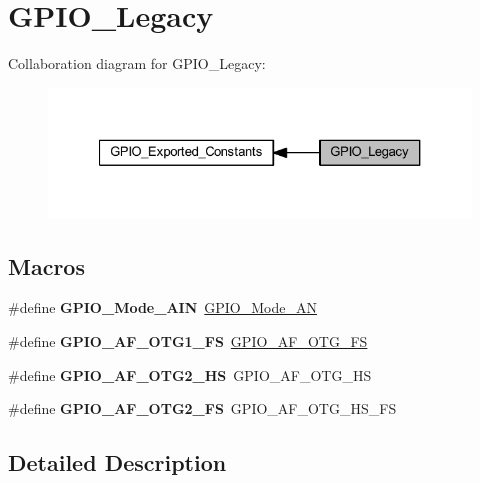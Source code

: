 \hypertarget{group___g_p_i_o___legacy}{}\section{G\+P\+I\+O\+\_\+\+Legacy}
\label{group___g_p_i_o___legacy}
Collaboration diagram for G\+P\+I\+O\+\_\+\+Legacy\+:\nopagebreak
\begin{figure}[H]
\begin{center}
\leavevmode
\includegraphics[width=327pt]{group___g_p_i_o___legacy}
\end{center}
\end{figure}
\subsection*{Macros}
\begin{DoxyCompactItemize}
\item 
\mbox{\label{group___g_p_i_o___legacy_gadf4dafa8caa4e91d2bee996c4bfdf8cc}} 
\#define {\bfseries G\+P\+I\+O\+\_\+\+Mode\+\_\+\+A\+IN}~\hyperlink{group___g_p_i_o_gga1347339e1c84a196fabbb31205eec5d4a6e5c0d7e6d2e22b834b24e1ca1d6d0db}{G\+P\+I\+O\+\_\+\+Mode\+\_\+\+AN}
\item 
\mbox{\label{group___g_p_i_o___legacy_gaddd737997abcd1154c0998b22333b579}} 
\#define {\bfseries G\+P\+I\+O\+\_\+\+A\+F\+\_\+\+O\+T\+G1\+\_\+\+FS}~\hyperlink{group___g_p_i_o___alternat__function__selection__define_gaeba0aeefec841e505170efc7762ae588}{G\+P\+I\+O\+\_\+\+A\+F\+\_\+\+O\+T\+G\+\_\+\+FS}
\item 
\mbox{\label{group___g_p_i_o___legacy_ga54715298b3dc7e843429fd3e24d42cd4}} 
\#define {\bfseries G\+P\+I\+O\+\_\+\+A\+F\+\_\+\+O\+T\+G2\+\_\+\+HS}~G\+P\+I\+O\+\_\+\+A\+F\+\_\+\+O\+T\+G\+\_\+\+HS
\item 
\mbox{\label{group___g_p_i_o___legacy_ga85e574d8321b9d9aaa2790351b4f0c1e}} 
\#define {\bfseries G\+P\+I\+O\+\_\+\+A\+F\+\_\+\+O\+T\+G2\+\_\+\+FS}~G\+P\+I\+O\+\_\+\+A\+F\+\_\+\+O\+T\+G\+\_\+\+H\+S\+\_\+\+FS
\end{DoxyCompactItemize}


\subsection{Detailed Description}
